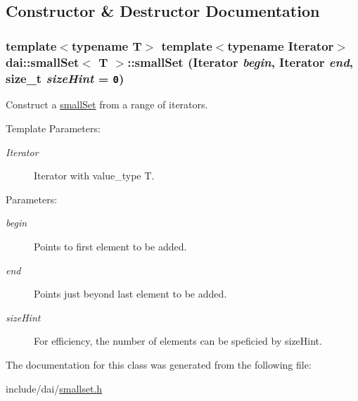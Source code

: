 \subsection{Constructor \& Destructor Documentation}
\hypertarget{classdai_1_1smallSet_54b3816da5edcd6bc664172ef05305a7}{
\subsubsection[smallSet]{\setlength{\rightskip}{0pt plus 5cm}template$<$typename T$>$ template$<$typename Iterator$>$ {\bf dai::smallSet}$<$ T $>$::{\bf smallSet} (Iterator {\em begin}, \/  Iterator {\em end}, \/  size\_\-t {\em sizeHint} = {\tt 0})}}
\label{classdai_1_1smallSet_54b3816da5edcd6bc664172ef05305a7}


Construct a \hyperlink{classdai_1_1smallSet}{smallSet} from a range of iterators. 

\begin{Desc}
\item[Template Parameters:]
\begin{description}
\item[{\em Iterator}]Iterator with value\_\-type T. \end{description}
\end{Desc}
\begin{Desc}
\item[Parameters:]
\begin{description}
\item[{\em begin}]Points to first element to be added. \item[{\em end}]Points just beyond last element to be added. \item[{\em sizeHint}]For efficiency, the number of elements can be speficied by sizeHint. \end{description}
\end{Desc}


The documentation for this class was generated from the following file:\begin{CompactItemize}
\item 
include/dai/\hyperlink{smallset_8h}{smallset.h}\end{CompactItemize}
